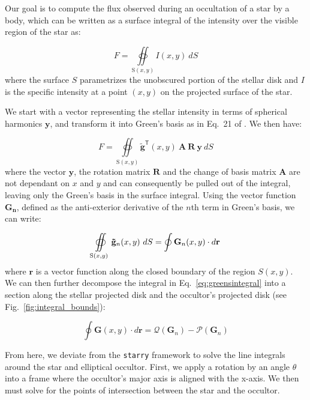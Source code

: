 \documentclass[twocolumn]{aastex631}
\begin{document}
Our goal is to compute the flux observed during an occultation of a star by a body, which can be written as a surface integral of the intensity over the visible region of the star as:

\begin{equation}
   F = \oiint\limits_{\mathrm{S}(x,y)} I(x,y) \ dS
\end{equation}
where the surface $S$ parametrizes the unobscured portion of the stellar disk and $I$ is the specific intensity at a point $(x,y)$ on the projected surface of the star.

We start with a vector representing the stellar intensity in terms of spherical harmonics $\mathbf{y}$, and transform it into Green's basis as in Eq.~21 of \citet{starry2019}. We then have: 

\begin{equation}
   F = \oiint\limits_{\mathrm{S}(x,y)} \mathbf{\tilde{g}}^\mathsf{T}(x,y) \ \mathbf{A}\ \mathbf{R}\ \mathbf{y}\ dS 
\end{equation}
where the vector $\mathbf{y}$, the rotation matrix $\mathbf{R}$ and the change of basis matrix $\mathbf{A}$ are not dependant on $x$ and $y$ and can consequently be pulled out of the integral, leaving only the Green's basis in the surface integral. Using the vector function $\mathbf{G_n}$, defined as the anti-exterior derivative of the $n$th term in Green's basis, we can write:

\begin{equation} \label{eq:greensintegral}
   \oiint\limits_{\mathrm{S}(x,y)} \mathbf{\tilde{g}}_n(x,y)\ dS \\
   = \oint \mathbf{G}_n(x,y) \cdot d\mathbf{r}
\end{equation}
where $\mathbf{r}$ is a vector function along the closed boundary of the region $S(x,y)$. We can then further decompose the integral in Eq.~\ref{eq:greensintegral} into a section along the stellar projected disk and the occultor's projected disk (see Fig.~\ref{fig:integral_bounds}):

\begin{equation} \label{eq:pandq}
    \oint \mathbf{G}(x,y) \cdot d\mathbf{r} = \mathcal{Q}(\mathbf{G}_n) - \mathcal{P}(\mathbf{G}_n)
\end{equation}

From here, we deviate from the \texttt{starry} framework to solve the line integrals around the star and elliptical occultor. First, we apply a rotation by an angle $\theta$ into a frame where the occultor's major axis is aligned with the x-axis. We then must solve for the points of intersection between the star and the occultor. 
\end{document}
